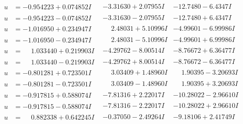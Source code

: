 \documentclass[1p]{elsarticle_modified}
\theoremstyle{definition}
\begin{document}
$$\begin{array}{c|c|c}
\begin{aligned}
u &= -0.954223 + 0.074852 I\end{aligned}
 & -3.31630 + 2.07955 I & -12.7480 - 6.4347 I \\ \hline\begin{aligned}
u &= -0.954223 - 0.074852 I\end{aligned}
 & -3.31630 - 2.07955 I & -12.7480 + 6.4347 I \\ \hline\begin{aligned}
u &= -1.016950 + 0.234947 I\end{aligned}
 & \phantom{-}2.48031 + 5.10996 I & -4.99601 - 6.99986 I \\ \hline\begin{aligned}
u &= -1.016950 - 0.234947 I\end{aligned}
 & \phantom{-}2.48031 - 5.10996 I & -4.99601 + 6.99986 I \\ \hline\begin{aligned}
u &= \phantom{-}1.033440 + 0.219903 I\end{aligned}
 & -4.29762 - 8.00514 I & -8.76672 + 6.36477 I \\ \hline\begin{aligned}
u &= \phantom{-}1.033440 - 0.219903 I\end{aligned}
 & -4.29762 + 8.00514 I & -8.76672 - 6.36477 I \\ \hline\begin{aligned}
u &= -0.801281 + 0.723501 I\end{aligned}
 & \phantom{-}3.03409 + 1.48960 I & \phantom{-}1.90395 - 3.20693 I \\ \hline\begin{aligned}
u &= -0.801281 - 0.723501 I\end{aligned}
 & \phantom{-}3.03409 - 1.48960 I & \phantom{-}1.90395 + 3.20693 I \\ \hline\begin{aligned}
u &= -0.917815 + 0.588074 I\end{aligned}
 & -7.81316 + 2.22017 I & -10.28022 - 2.96610 I \\ \hline\begin{aligned}
u &= -0.917815 - 0.588074 I\end{aligned}
 & -7.81316 - 2.22017 I & -10.28022 + 2.96610 I \\ \hline\begin{aligned}
u &= \phantom{-}0.882338 + 0.642245 I\end{aligned}
 & -0.37050 - 2.49264 I & -9.18106 + 2.41749 I \\ \hline\begin{aligned}

\end{aligned}
\end{array}$$
\end{document}
